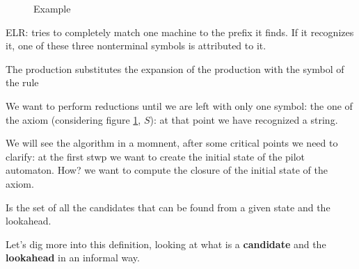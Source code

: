 \begin{figure}[H]
{
					\label{fig:C}
				}
                \caption{Example}
                \label{fig:mainexample}
			\end{figure}
			ELR: tries to completely match one machine to the prefix it finds. If it recognizes it, one of these three nonterminal symbols is attributed to it.
			\begin{definition}[Reduction]
				The production substitutes the expansion of the production with the symbol of the rule
			\end{definition}
			We want to perform reductions until we are left with only one symbol: the one of the axiom (considering figure \ref{fig:mainexample}, $S$): at that point 
			we have recognized a string.

			We will see the algorithm in a momnent, after some critical points we need to clarify: at the first stwp we want to create the initial state of the pilot 
			automaton. How? we want to compute the closure of the initial state of the axiom.
			\begin{definition}[Closure]
				Is the set of all the candidates that can be found from a given state and the lookahead.
			\end{definition}
			Let's dig more into this definition, looking at what is a \textbf{candidate} and the \textbf{lookahead} in an informal way.

